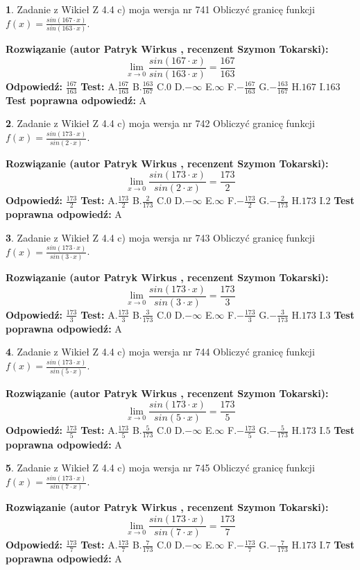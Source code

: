 \documentclass[12pt, a4paper]{article}
\theoremstyle{definition} %
\newtheorem{zad}{}
\newcommand{\zadStart}[1]{\begin{zad}#1\newline}
\newcommand{\zadStop}{\end{zad}}
\newcommand{\rozwStart}[2]{\noindent \textbf{Rozwiązanie (autor #1 , recenzent #2): }\newline}
\newcommand{\rozwStop}{\newline}
\newcommand{\odpStart}{\noindent \textbf{Odpowiedź:}\newline}
\newcommand{\odpStop}{\newline}
\newcommand{\testStart}{\noindent \textbf{Test:}\newline}
\newcommand{\testStop}{\newline}
\newcommand{\kluczStart}{\noindent \textbf{Test poprawna odpowiedź:}\newline}
\newcommand{\kluczStop}{\newline}
\begin{document}
\zadStart{Zadanie z Wikieł Z 4.4 c) moja wersja nr 741}
Obliczyć granicę funkcji $f(x)=\frac{sin(167\cdot x)}{sin(163\cdot x)}$.
\zadStop
\rozwStart{Patryk Wirkus}{Szymon Tokarski}
$$\lim\limits_{x\to 0}\frac{sin(167\cdot x)}{sin(163\cdot x)}=
\frac{167}{163}$$
\rozwStop
\odpStart
$\frac{167}{163}$
\odpStop
\testStart
A.$\frac{167}{163}$
B.$\frac{163}{167}$
C.$0$
D.$-\infty$
E.$\infty$
F.$-\frac{167}{163}$
G.$-\frac{163}{167}$
H.$167$
I.$163$
\testStop
\kluczStart
A
\kluczStop



\zadStart{Zadanie z Wikieł Z 4.4 c) moja wersja nr 742}
Obliczyć granicę funkcji $f(x)=\frac{sin(173\cdot x)}{sin(2\cdot x)}$.
\zadStop
\rozwStart{Patryk Wirkus}{Szymon Tokarski}
$$\lim\limits_{x\to 0}\frac{sin(173\cdot x)}{sin(2\cdot x)}=
\frac{173}{2}$$
\rozwStop
\odpStart
$\frac{173}{2}$
\odpStop
\testStart
A.$\frac{173}{2}$
B.$\frac{2}{173}$
C.$0$
D.$-\infty$
E.$\infty$
F.$-\frac{173}{2}$
G.$-\frac{2}{173}$
H.$173$
I.$2$
\testStop
\kluczStart
A
\kluczStop



\zadStart{Zadanie z Wikieł Z 4.4 c) moja wersja nr 743}
Obliczyć granicę funkcji $f(x)=\frac{sin(173\cdot x)}{sin(3\cdot x)}$.
\zadStop
\rozwStart{Patryk Wirkus}{Szymon Tokarski}
$$\lim\limits_{x\to 0}\frac{sin(173\cdot x)}{sin(3\cdot x)}=
\frac{173}{3}$$
\rozwStop
\odpStart
$\frac{173}{3}$
\odpStop
\testStart
A.$\frac{173}{3}$
B.$\frac{3}{173}$
C.$0$
D.$-\infty$
E.$\infty$
F.$-\frac{173}{3}$
G.$-\frac{3}{173}$
H.$173$
I.$3$
\testStop
\kluczStart
A
\kluczStop



\zadStart{Zadanie z Wikieł Z 4.4 c) moja wersja nr 744}
Obliczyć granicę funkcji $f(x)=\frac{sin(173\cdot x)}{sin(5\cdot x)}$.
\zadStop
\rozwStart{Patryk Wirkus}{Szymon Tokarski}
$$\lim\limits_{x\to 0}\frac{sin(173\cdot x)}{sin(5\cdot x)}=
\frac{173}{5}$$
\rozwStop
\odpStart
$\frac{173}{5}$
\odpStop
\testStart
A.$\frac{173}{5}$
B.$\frac{5}{173}$
C.$0$
D.$-\infty$
E.$\infty$
F.$-\frac{173}{5}$
G.$-\frac{5}{173}$
H.$173$
I.$5$
\testStop
\kluczStart
A
\kluczStop



\zadStart{Zadanie z Wikieł Z 4.4 c) moja wersja nr 745}
Obliczyć granicę funkcji $f(x)=\frac{sin(173\cdot x)}{sin(7\cdot x)}$.
\zadStop
\rozwStart{Patryk Wirkus}{Szymon Tokarski}
$$\lim\limits_{x\to 0}\frac{sin(173\cdot x)}{sin(7\cdot x)}=
\frac{173}{7}$$
\rozwStop
\odpStart
$\frac{173}{7}$
\odpStop
\testStart
A.$\frac{173}{7}$
B.$\frac{7}{173}$
C.$0$
D.$-\infty$
E.$\infty$
F.$-\frac{173}{7}$
G.$-\frac{7}{173}$
H.$173$
I.$7$
\testStop
\kluczStart
A
\kluczStop
\end{document}
